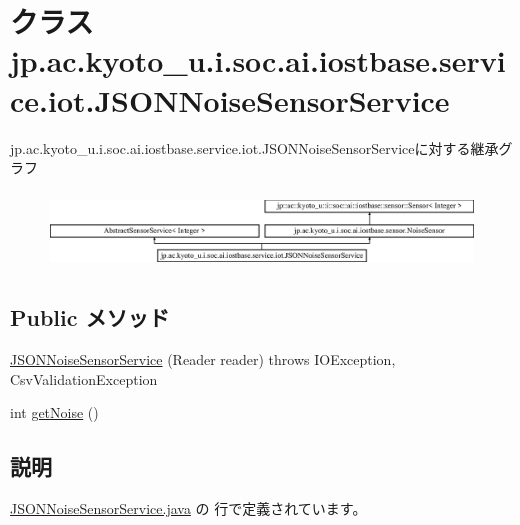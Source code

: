 \hypertarget{classjp_1_1ac_1_1kyoto__u_1_1i_1_1soc_1_1ai_1_1iostbase_1_1service_1_1iot_1_1_j_s_o_n_noise_sensor_service}{\section{クラス jp.\-ac.\-kyoto\-\_\-u.\-i.\-soc.\-ai.\-iostbase.\-service.\-iot.\-J\-S\-O\-N\-Noise\-Sensor\-Service}
\label{classjp_1_1ac_1_1kyoto__u_1_1i_1_1soc_1_1ai_1_1iostbase_1_1service_1_1iot_1_1_j_s_o_n_noise_sensor_service}
}
jp.\-ac.\-kyoto\-\_\-u.\-i.\-soc.\-ai.\-iostbase.\-service.\-iot.\-J\-S\-O\-N\-Noise\-Sensor\-Serviceに対する継承グラフ\begin{figure}[H]
\begin{center}
\leavevmode
\includegraphics[height=2.058824cm]{classjp_1_1ac_1_1kyoto__u_1_1i_1_1soc_1_1ai_1_1iostbase_1_1service_1_1iot_1_1_j_s_o_n_noise_sensor_service}
\end{center}
\end{figure}
\subsection*{Public メソッド}
\begin{DoxyCompactItemize}
\item 
\hyperlink{classjp_1_1ac_1_1kyoto__u_1_1i_1_1soc_1_1ai_1_1iostbase_1_1service_1_1iot_1_1_j_s_o_n_noise_sensor_service_aac8c64887a58a3265f6fb1aa276f90dc}{J\-S\-O\-N\-Noise\-Sensor\-Service} (Reader reader)  throws I\-O\-Exception, Csv\-Validation\-Exception 
\item 
int \hyperlink{classjp_1_1ac_1_1kyoto__u_1_1i_1_1soc_1_1ai_1_1iostbase_1_1service_1_1iot_1_1_j_s_o_n_noise_sensor_service_aeb60583425a5503985769cdca80d7f1c}{get\-Noise} ()
\end{DoxyCompactItemize}


\subsection{説明}


 \hyperlink{_j_s_o_n_noise_sensor_service_8java_source}{J\-S\-O\-N\-Noise\-Sensor\-Service.\-java} の  行で定義されています。



